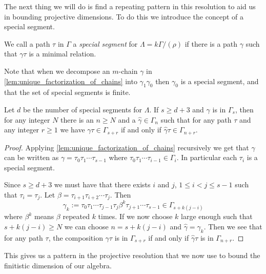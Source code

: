 The next thing we will do is find a repeating pattern in this resolution to aid us in bounding projective dimensions. To do this we introduce the concept of a special segment.

\begin{defn}
	We call a path $\tau$ in $\Gamma$ a \emph{special segment} for $\Lambda = k\Gamma/(\rho)$ if there is a path $\gamma$ such that $\gamma\tau$ is a minimal relation.
\end{defn}

Note that when we decompose an $m$-chain $\gamma$ in \cref{lem:unique_factorization_of_chains} into $\gamma_1\gamma_0$ then $\gamma_0$ is a special segment, and that the set of special segments is finite.

\begin{lemma}\cite[Theorem~2.2]{GKK91}\label{lem:monomial_relation_repetition}
	Let $d$ be the number of special segments for $\Lambda$. If $s \geq d+3$ and $\gamma$ is in $\Gamma_s$, then for any integer $N$ there is an $n \geq N$ and a $\hat{\gamma} \in \Gamma_n$ such that for any path $\tau$ and any integer $r \geq 1$ we have $\gamma\tau \in \Gamma_{s+r}$ if and only if $\hat{\gamma}\tau \in \Gamma_{n+r}$.
	\begin{proof}
		Applying \cref{lem:unique_factorization_of_chains} recursively we get that $\gamma$ can be written as $\gamma = \tau_0\tau_1\cdots \tau_{s-1}$ where $\tau_0\tau_1 \cdots \tau_{i-1} \in \Gamma_i$. In particular each $\tau_i$ is a special segment.
		
		Since $s \geq d+3$ we must have that there exists $i$ and $j$, $1\leq i < j \leq s-1$ such that $\tau_i=\tau_j$. Let $\beta = \tau_{i+1}\tau_{i+2}\cdots\tau_j$. Then $$\gamma_k := \tau_0\tau_1\cdots\tau_{j-1}\tau_j\beta^k\tau_{j+1}\cdots\tau_{s-1} \in \Gamma_{s + k(j-i)}$$
		where $\beta^k$ means $\beta$ repeated $k$ times. If we now choose $k$ large enough such that $s+k(j-i) \geq N$ we can choose $n=s+k(j-i)$ and $\hat{\gamma}=\gamma_k$. Then we see that for any path $\tau$, the composition $\gamma\tau$ is in $\Gamma_{s+r}$ if and only if $\hat{\gamma}\tau$ is in $\Gamma_{n+r}$.
	\end{proof}
\end{lemma}

This gives us a pattern in the projective resolution that we now use to bound the finitistic dimension of our algebra.

